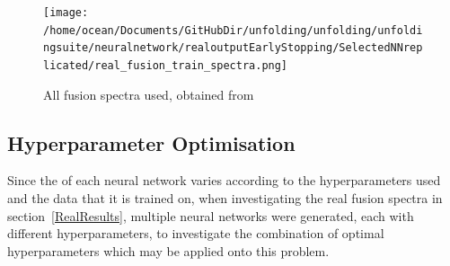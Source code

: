\documentclass[a4paper, 12pt]{article}
\begin{document}
\begin{figure}
\centering
\texttt{[image: /home/ocean/Documents/GitHubDir/unfolding/unfolding/unfoldingsuite/neuralnetwork/realoutputEarlyStopping/SelectedNNreplicated/real\_fusion\_train\_spectra.png]}
\caption{All fusion spectra used, obtained from \cite{IAEAUKAEACompendium}}\label{RealFusionTrain}
\end{figure}

\subsection{Hyperparameter Optimisation}
    Since the of each neural network varies according to the hyperparameters used and the data that it is trained on, when investigating the real fusion spectra in section~\ref{RealResults}, multiple neural networks were generated, each with different hyperparameters, to investigate the combination of optimal hyperparameters which may be applied onto this problem.
\end{document}
